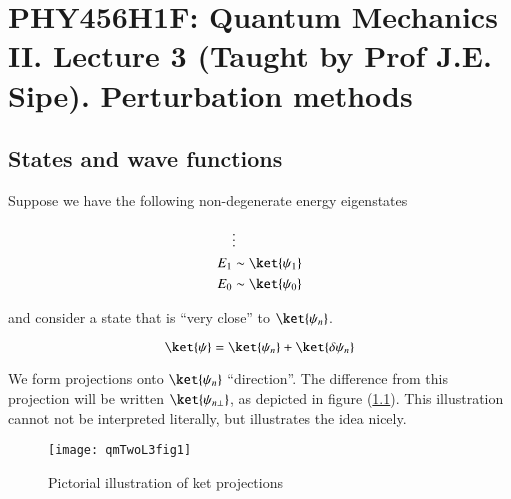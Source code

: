 %
%

\chapter{PHY456H1F: Quantum Mechanics II.  Lecture 3 (Taught by Prof J.E. Sipe).  Perturbation methods}
\label{chap:qmTwoL3}
{}
\date{Sept 19, 2011}

\beginArtWithToc

%

\section{States and wave functions}

Suppose we have the following non-degenerate energy eigenstates

\begin{align*}
&\vdots \\
E_1 &\sim \ket{\psi_1} \\
E_0 &\sim \ket{\psi_0}
\end{align*}

and consider a state that is ``very close'' to $\ket{\psi_n}$.

\begin{equation}\label{eqn:qmTwoL3:10}
\ket{\psi} = \ket{\psi_n} + \ket{\delta \psi_n}
\end{equation}

We form projections onto $\ket{\psi_n}$ ``direction''.  The difference from this projection will be written $\ket{\psi_{n \perp}}$, as depicted in figure (\ref{fig:qmTwoL3fig1}).  This illustration cannot not be interpreted literally, but illustrates the idea nicely.

\begin{figure}[htp]
\centering
\texttt{[image: qmTwoL3fig1]}
\caption{Pictorial illustration of ket projections}\label{fig:qmTwoL3fig1}
\end{figure}

